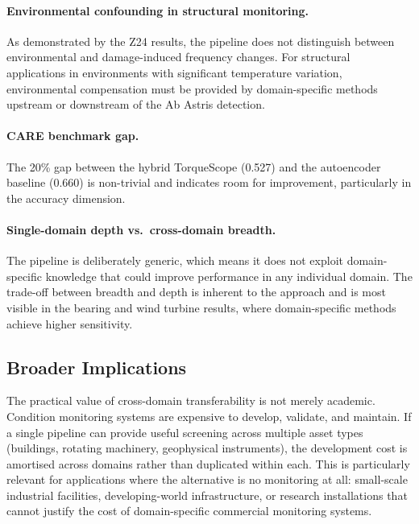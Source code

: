 \documentclass[11pt,a4paper]{article}
\begin{document}
\paragraph{Environmental confounding in structural monitoring.} As demonstrated by the Z24 results, the pipeline does not distinguish between environmental and damage-induced frequency changes. For structural applications in environments with significant temperature variation, environmental compensation must be provided by domain-specific methods upstream or downstream of the Ab Astris detection.

\paragraph{CARE benchmark gap.} The 20\% gap between the hybrid TorqueScope (0.527) and the autoencoder baseline (0.660) is non-trivial and indicates room for improvement, particularly in the accuracy dimension.

\paragraph{Single-domain depth vs.\ cross-domain breadth.} The pipeline is deliberately generic, which means it does not exploit domain-specific knowledge that could improve performance in any individual domain. The trade-off between breadth and depth is inherent to the approach and is most visible in the bearing and wind turbine results, where domain-specific methods achieve higher sensitivity.

\subsection{Broader Implications}
\label{sec:implications}

The practical value of cross-domain transferability is not merely academic. Condition monitoring systems are expensive to develop, validate, and maintain. If a single pipeline can provide useful screening across multiple asset types (buildings, rotating machinery, geophysical instruments), the development cost is amortised across domains rather than duplicated within each. This is particularly relevant for applications where the alternative is no monitoring at all: small-scale industrial facilities, developing-world infrastructure, or research installations that cannot justify the cost of domain-specific commercial monitoring systems.
\end{document}
